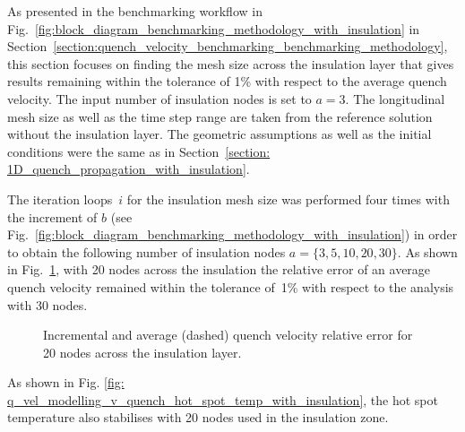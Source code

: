 As presented in the benchmarking workflow in Fig.~\ref{fig:block_diagram_benchmarking_methodology_with_insulation} in Section~\ref{section:quench_velocity_benchmarking_benchmarking_methodology}, this section focuses on finding the mesh size across the insulation layer that gives results remaining within the tolerance of 1\% with respect to the average quench velocity. The input number of insulation nodes is set to $a=3$. The longitudinal mesh size as well as the time step range are taken from the reference solution without the insulation layer. The geometric assumptions as well as the initial conditions were the same as in Section~\ref{section: 1D_quench_propagation_with_insulation}. 

The iteration loops~$i$ for the insulation mesh size was performed four times with the increment of $b$ (see Fig.~\ref{fig:block_diagram_benchmarking_methodology_with_insulation}) in order to obtain the following number of insulation nodes $a=\{3, 5, 10, 20, 30\}$. As shown in Fig.~\ref{fig: q_vel_modelling_v_quench_rel_error_with_insulation}, with 20 nodes across the insulation the relative error of an average quench velocity remained within the tolerance of~1\% with respect to the analysis with 30 nodes. 

\begin{figure}[H]
\centering
    \caption{Incremental and average (dashed) quench velocity relative error for 20 nodes across the insulation layer.}
    \label{fig: q_vel_modelling_v_quench_rel_error_with_insulation}
\end{figure}

As shown in Fig. \ref{fig: q_vel_modelling_v_quench_hot_spot_temp_with_insulation}, the hot spot temperature also stabilises with 20 nodes used in the insulation zone. 

